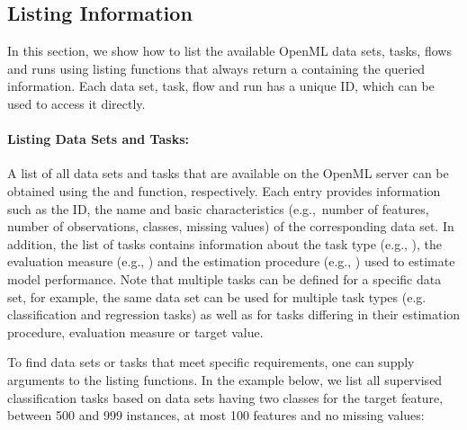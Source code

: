 \subsection{Listing Information}

In this section, we show how to list the available OpenML data sets, tasks, flows
and runs using listing functions that %
always return a  containing the queried information.
Each data set, task, flow and run has a unique ID, which can be used to access it directly.

\paragraph{Listing Data Sets and Tasks:}
A list of all data sets and tasks that are available on the OpenML server
can be obtained using the  and  function,
respectively.
Each entry provides information such as the ID, the name and basic
characteristics (e.g.,\ number of features, number of observations, classes, missing values) of the corresponding data set.
In addition, the list of tasks contains information about the task type (e.g., ), the evaluation measure
(e.g., ) and the estimation procedure (e.g., ) used to estimate model performance.
Note that multiple tasks can be defined for a specific data set, for example, the same data set can be used for multiple task types
(e.g. classification and regression tasks) as well as for tasks differing in their estimation procedure,
evaluation measure or target value. 

To find data sets or tasks that meet specific
requirements, one can supply arguments to the listing functions.
In the example below, we list all supervised classification tasks based on data sets having two classes for the target feature,
between 500 and 999 instances, at most 100 features and no missing values:

